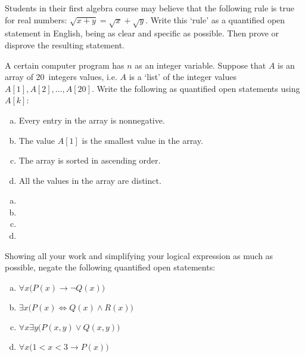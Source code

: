 \documentclass[11pt,letterpaper]{article}
\begin{document}
\newpage



 Students in their first algebra course may believe that the following rule is true for real numbers: $\sqrt{x + y}= \sqrt{x} + \sqrt{y}$. Write this `rule' as a quantified open statement in English, being as clear and specific as possible. Then prove or disprove the resulting statement. \pspace

\sol 



\newpage



 A certain computer program has $n$ as an integer variable. Suppose that $A$ is an array of 20~integers values, i.e. $A$ is a `list' of the integer values $A[1], A[2], \ldots, A[20]$. Write the following as quantified open statements using $A[k]$:
	\begin{enumerate}[(a)]
	\item Every entry in the array is nonnegative.
	\item The value $A[1]$ is the smallest value in the array.
	\item The array is sorted in ascending order. 
	\item All the values in the array are distinct. 
	\end{enumerate} \pspace

\sol
\begin{enumerate}[(a)]
\item 
\item 
\item 
\item 
\end{enumerate}



\newpage



 Showing all your work and simplifying your logical expression as much as possible, negate the following quantified open statements:
	\begin{enumerate}[(a)]
	\item $\forall x \big( P(x) \to \neg Q(x) \big)$
	\item $\exists x \big( P(x) \Longleftrightarrow Q(x) \wedge R(x) \big)$
	\item $\forall x \exists y \big( P(x, y) \vee Q(x, y) \big)$
	\item $\forall x \big( 1 < x < 3 \to P(x) \big)$
	\end{enumerate} \pspace
\end{document}
